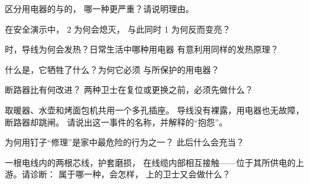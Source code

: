 \begin{exercise}[$\star$]\label{exo:g7:short-circuits-safety:2}
区分用电器的与的，
哪一种更严重？请说明理由。
\end{exercise}

\begin{exercise}[$\star$]\label{exo:g7:short-circuits-safety:3}
在安全演示中， 2 为何会熄灭，
与此同时 1 为何反而变亮？
\end{exercise}

\begin{exercise}[$\star$]\label{exo:g7:short-circuits-safety:4}
时，导线为何会发热？日常生活中哪种用电器
有意利用同样的发热原理？
\end{exercise}

\begin{exercise}[$\star$]\label{exo:g7:short-circuits-safety:5}
什么是，它牺牲了什么？为何它必须
与所保护的用电器？
\end{exercise}

\begin{exercise}[$\star$]\label{exo:g7:short-circuits-safety:6}
断路器比有何改进？
两种卫士在复位或更换之前，必须先做什么？
\end{exercise}

\begin{exercise}[$\star$]\label{exo:g7:short-circuits-safety:7}
取暖器、水壶和烤面包机共用一个多孔插座。
导线没有裸露，用电器也无故障，断路器却跳闸。
请说出这一事件的名称，并解释的“抱怨”。
\end{exercise}

\begin{exercise}[$\star$]\label{exo:g7:short-circuits-safety:8}
为何用钉子“修理”是家中最危险的行为之一？
此后什么会充当？
\end{exercise}

\begin{exercise}[$\star\star$]\label{exo:g7:short-circuits-safety:9}
一根电线内的两根芯线，护套磨损，
在线缆内部相互接触——位于其所供电的上游。请诊断：
属于哪一种，会怎样，
上的卫士又会做什么？
\end{exercise}

